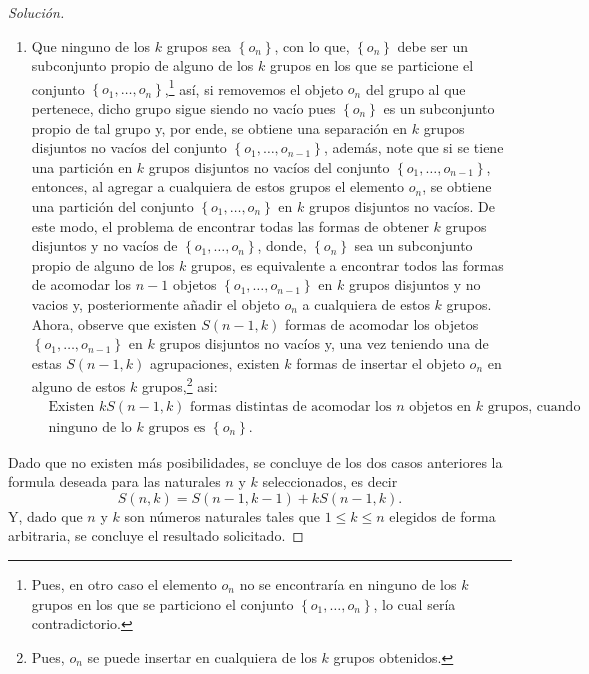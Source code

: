 \documentclass[10.5pt,notitlepage]{article}
\newenvironment{solucion}
  {\begin{proof}[Solución]}
  {\end{proof}}
\newcommand{\kis}[1]{\left\{ #1 \right\}}
\theoremstyle{plain}
\begin{document}
\begin{solucion}
\begin{enumerate}
    \item[\textit{2}.] Que ninguno de los \(k\) grupos sea \(\kis{o_n}\), con lo que, \(\kis{o_{n}}\) debe ser un subconjunto propio de alguno de los \(k\) grupos en los que se particione el conjunto \(\kis{o_1, \hdots, o_n}\),\footnote{Pues, en otro caso el elemento \(o_n\) no se encontraría en ninguno de los \(k\) grupos en los que se particiono el conjunto \(\kis{o_1, \hdots, o_n}\), lo cual sería contradictorio.} así, si removemos el objeto \(o_n\) del grupo al que pertenece, dicho grupo sigue siendo no vacío pues \(\kis{o_n}\) es un subconjunto propio de tal grupo y, por ende, se obtiene una separación en \(k\) grupos  disjuntos no vacíos del conjunto \(\kis{o_1, \hdots, o_{n-1}}\), además, note que si se tiene una partición en \(k\) grupos disjuntos no vacíos del conjunto \(\kis{o_1, \hdots, o_{n-1}}\), entonces, al agregar a cualquiera de estos grupos el elemento \(o_{n}\), se obtiene una partición del conjunto \(\kis{o_1, \hdots, o_n}\) en \(k\) grupos disjuntos no vacíos. De este modo, el problema de encontrar todas las formas de obtener \(k\) grupos disjuntos y no vacíos de \(\kis{o_1, \hdots, o_n}\), donde, \(\kis{o_n}\) sea un subconjunto propio de alguno de los \(k\) grupos, es equivalente a encontrar todos las formas de acomodar los \(n-1\) objetos \(\kis{o_1, \hdots, o_{n-1}}\) en \(k\) grupos disjuntos y no vacios y, posteriormente añadir el objeto \(o_{n}\) a cualquiera de estos \(k\) grupos. Ahora, observe que existen \(S(n-1,k)\) formas de acomodar los objetos \(\kis{o_1, \hdots, o_{n-1}}\) en \(k\) grupos disjuntos no vacíos y, una vez teniendo una de estas \(S(n-1,k)\) agrupaciones, existen \(k\) formas de insertar el objeto \(o_{n}\) en alguno de estos \(k\) grupos,\footnote{Pues, \(o_n\) se puede insertar en cualquiera de los \(k\) grupos obtenidos.} asi: 
    \begin{align*}
          &\text{Existen \(kS(n-1, k)\) formas distintas de acomodar los \(n\) objetos en \(k\) grupos, cuando} \\
          &\text{ninguno de lo \(k\) grupos es \(\kis{o_n}\).}   
    \end{align*}
 \end{enumerate}
 Dado que no existen más posibilidades, se concluye de los dos casos anteriores la formula deseada para las naturales \(n\) y \(k\) seleccionados, es decir 
 \begin{equation}\label{str}
 S(n,k) = S(n-1, k-1) + k S(n-1,k).     
 \end{equation}
 Y, dado que \(n\) y \(k\) son números naturales tales que \(1 \leq k \leq n\) elegidos de forma arbitraria, se concluye el resultado solicitado.


\end{solucion}
\end{document}
